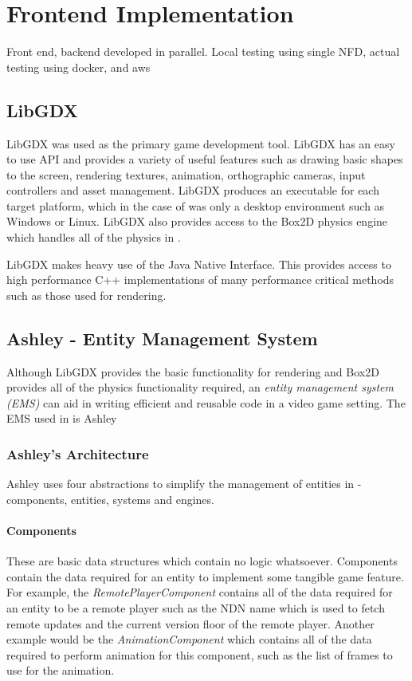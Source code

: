\chapter{Frontend Implementation}
Front end, backend developed in parallel. Local testing using single NFD, actual testing using docker, and aws

\section{LibGDX}
LibGDX \cite{libgdx} was used as the primary game development tool. LibGDX has an easy to use API and provides a variety of useful features such as drawing basic shapes to the screen, rendering textures, animation, orthographic cameras, input controllers and asset management. LibGDX produces an executable for each target platform, which in the case of \game{} was only a desktop environment such as Windows or Linux. LibGDX also provides access to the Box2D \cite{box2d} physics engine which handles all of the physics in \game{}. 

LibGDX makes heavy use of the Java Native Interface. This provides access to high performance C++ implementations of many performance critical methods such as those used for rendering. 


\section{Ashley - Entity Management System}\label{sec:impl:ashley}
Although LibGDX provides the basic functionality for rendering and Box2D provides all of the physics functionality required, an \textit{entity management system (EMS)} can aid in writing efficient and reusable code in a video game setting. The EMS used in \game{} is Ashley \cite{ashley}

\subsection{Ashley's Architecture}
Ashley uses four abstractions to simplify the management of entities in \game{} - components, entities, systems and engines. 

\subsubsection{Components}
These are basic data structures which contain no logic whatsoever. Components contain the data required for an entity to implement some tangible game feature. For example, the \textit{RemotePlayerComponent} contains all of the data required for an entity to be a remote player such as the NDN name which is used to fetch remote updates and the current version floor of the remote player. Another example would be the \textit{AnimationComponent} which contains all of the data required to perform animation for this component, such as the list of frames to use for the animation. 

